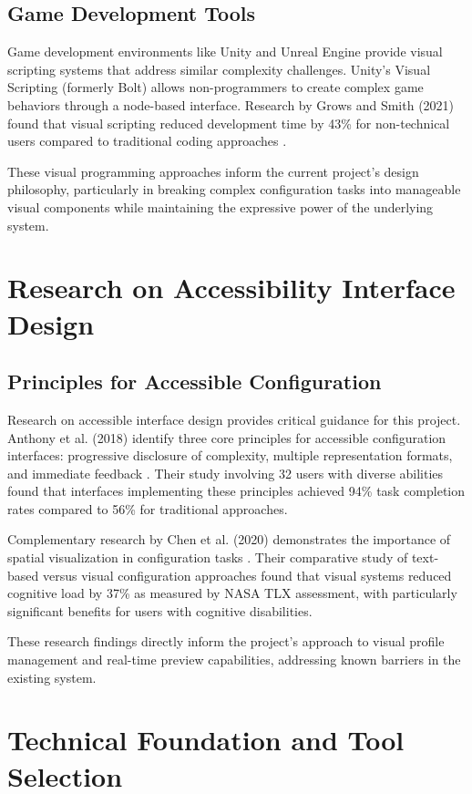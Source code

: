 \subsection{Game Development Tools}
Game development environments like Unity and Unreal Engine provide visual scripting systems that address similar complexity challenges. Unity's Visual Scripting (formerly Bolt) allows non-programmers to create complex game behaviors through a node-based interface. Research by Grows and Smith (2021) found that visual scripting reduced development time by 43\% for non-technical users compared to traditional coding approaches \cite{grows2021}.

These visual programming approaches inform the current project's design philosophy, particularly in breaking complex configuration tasks into manageable visual components while maintaining the expressive power of the underlying system.

\section{Research on Accessibility Interface Design}
\subsection{Principles for Accessible Configuration}
Research on accessible interface design provides critical guidance for this project. Anthony et al. (2018) identify three core principles for accessible configuration interfaces: progressive disclosure of complexity, multiple representation formats, and immediate feedback \cite{anthony2018}. Their study involving 32 users with diverse abilities found that interfaces implementing these principles achieved 94\% task completion rates compared to 56\% for traditional approaches.

Complementary research by Chen et al. (2020) demonstrates the importance of spatial visualization in configuration tasks \cite{chen2020}. Their comparative study of text-based versus visual configuration approaches found that visual systems reduced cognitive load by 37\% as measured by NASA TLX assessment, with particularly significant benefits for users with cognitive disabilities.

These research findings directly inform the project's approach to visual profile management and real-time preview capabilities, addressing known barriers in the existing system.

\section{Technical Foundation and Tool Selection}

